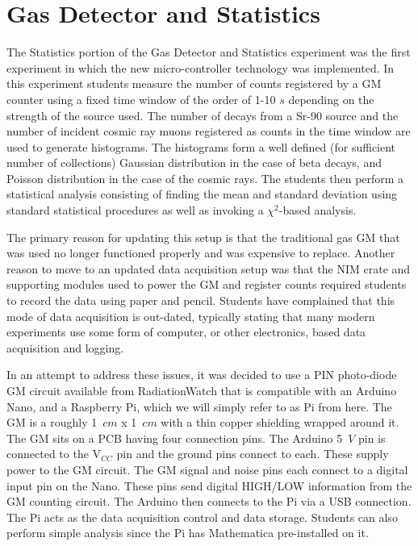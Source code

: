 \section{Gas Detector and Statistics}
The Statistics portion of the Gas Detector and Statistics experiment was the first experiment in which the new micro-controller technology was implemented.
In this experiment students measure the number of counts registered by a GM counter using a fixed time window of the order of 1-10 $s$ depending on the strength of the source used.
The number of decays from a Sr-90 source and the number of incident cosmic ray muons registered as counts in the time window are used to generate histograms.
The histograms form a well defined (for sufficient number of collections) Gaussian distribution in the case of beta decays, and Poisson distribution in the case of the cosmic rays.
The students then perform a statistical analysis consisting of finding the mean and standard deviation using standard statistical procedures as well as invoking a $\chi^2$-based analysis.

The primary reason for updating this setup is that the traditional gas GM that was used no longer functioned properly and was expensive to replace.
Another reason to move to an updated data acquisition setup was that the NIM crate and supporting modules used to power the GM and register counts required students to record the data using paper and pencil.
Students have complained that this mode of data acquisition is out-dated, typically stating that many modern experiments use some form of computer, or other electronics, based data acquisition and logging.


In an attempt to address these issues, it was decided to use a PIN photo-diode GM circuit available from RadiationWatch that is compatible with an Arduino Nano, and a Raspberry Pi, which we will simply refer to as Pi from here.
The GM is a roughly 1~$cm$ x 1~$cm$ with a thin copper shielding wrapped around it.
The GM sits on a PCB having four connection pins.
The Arduino 5~$V$ pin is connected to the V$_{CC}$ pin and the ground pins connect to each.
These supply power to the GM circuit.
The GM signal and noise pins each connect to a digital input pin on the Nano.
These pins send digital HIGH/LOW information from the GM counting circuit.
The Arduino then connects to the Pi via a USB connection.
The Pi acts as the data acquisition control and data storage.
Students can also perform simple analysis since the Pi has Mathematica pre-installed on it.

